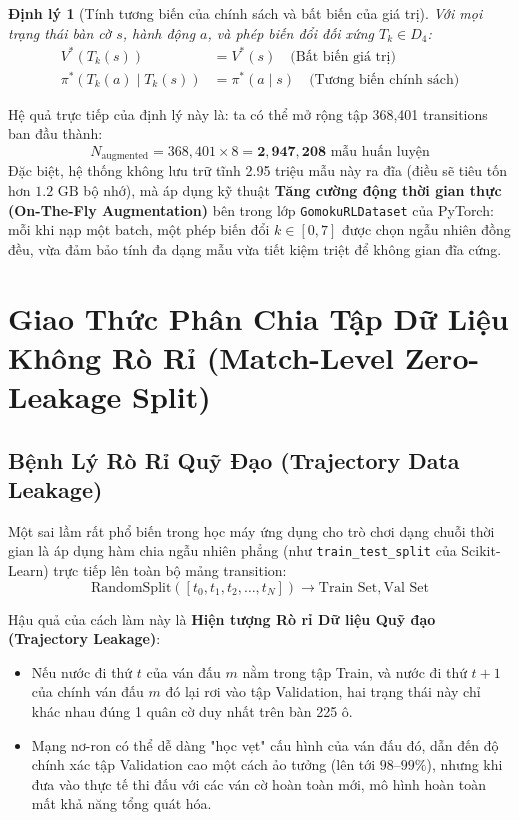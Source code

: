 \documentclass[11pt,a4paper]{report}
\newtheorem{theorem}{Định lý}[chapter]
\begin{document}
\begin{theorem}[Tính tương biến của chính sách và bất biến của giá trị]
Với mọi trạng thái bàn cờ $s$, hành động $a$, và phép biến đổi đối xứng $T_k \in D_4$:
\begin{align}
    V^*(T_k(s)) &= V^*(s) \quad \text{(Bất biến giá trị)} \\
    \pi^*(T_k(a) \mid T_k(s)) &= \pi^*(a \mid s) \quad \text{(Tương biến chính sách)}
\end{align}
\end{theorem}

Hệ quả trực tiếp của định lý này là: ta có thể mở rộng tập 368,401 transitions ban đầu thành:
\begin{equation}
    N_{\text{augmented}} = 368{,}401 \times 8 = \mathbf{2{,}947{,}208}\text{ mẫu huấn luyện}
\end{equation}
Đặc biệt, hệ thống không lưu trữ tĩnh 2.95 triệu mẫu này ra đĩa (điều sẽ tiêu tốn hơn $1.2\text{ GB}$ bộ nhớ), mà áp dụng kỹ thuật \textbf{Tăng cường động thời gian thực (On-The-Fly Augmentation)} bên trong lớp \texttt{GomokuRLDataset} của PyTorch: mỗi khi nạp một batch, một phép biến đổi $k \in [0, 7]$ được chọn ngẫu nhiên đồng đều, vừa đảm bảo tính đa dạng mẫu vừa tiết kiệm triệt để không gian đĩa cứng.

\chapter{Giao Thức Phân Chia Tập Dữ Liệu Không Rò Rỉ (Match-Level Zero-Leakage Split)}

\section{Bệnh Lý Rò Rỉ Quỹ Đạo (Trajectory Data Leakage)}

Một sai lầm rất phổ biến trong học máy ứng dụng cho trò chơi dạng chuỗi thời gian là áp dụng hàm chia ngẫu nhiên phẳng (như \texttt{train\_test\_split} của Scikit-Learn) trực tiếp lên toàn bộ mảng transition:
\begin{equation}
    \text{RandomSplit}([t_0, t_1, t_2, \dots, t_N]) \longrightarrow \text{Train Set}, \text{Val Set}
\end{equation}

Hậu quả của cách làm này là \textbf{Hiện tượng Rò rỉ Dữ liệu Quỹ đạo (Trajectory Leakage)}:
\begin{itemize}
    \item Nếu nước đi thứ $t$ của ván đấu $m$ nằm trong tập Train, và nước đi thứ $t+1$ của chính ván đấu $m$ đó lại rơi vào tập Validation, hai trạng thái này chỉ khác nhau đúng 1 quân cờ duy nhất trên bàn 225 ô.
    \item Mạng nơ-ron có thể dễ dàng "học vẹt" cấu hình của ván đấu đó, dẫn đến độ chính xác tập Validation cao một cách ảo tưởng (lên tới $98\text{--}99\%$), nhưng khi đưa vào thực tế thi đấu với các ván cờ hoàn toàn mới, mô hình hoàn toàn mất khả năng tổng quát hóa.
\end{itemize}
\end{document}
